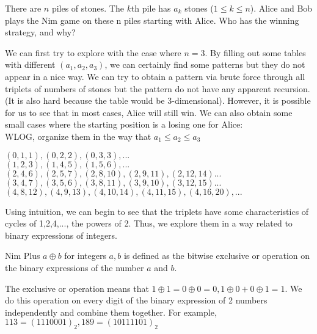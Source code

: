 		\begin{problem}
			There are $n$ piles of stones. The $k$th pile has $a_k$ stones ($1\leq k\leq n$). Alice and Bob plays the Nim game on these n piles starting with Alice. Who has the winning strategy, and why?
		\end{problem}
		We can first try to explore with the case where $n=3$. By filling out some tables with different $(a_1,a_2,a_3)$, we can certainly find some patterns but they do not appear in a nice way. We can try to obtain a pattern via brute force through all triplets of numbers of stones but the pattern do not have any apparent recursion. (It is also hard because the table would be 3-dimensional). However, it is possible for us to see that in most cases, Alice will still win. We can also obtain some small cases where the starting position is a losing one for Alice:\\
		WLOG, organize them in the way that $a_1 \leq a_2 \leq a_3$
		\begin{center}
		$(0,1,1),(0,2,2),(0,3,3),...$\\
		$(1,2,3),(1,4,5),(1,5,6),...$\\
		$(2,4,6),(2,5,7),(2,8,10),(2,9,11),(2,12,14)...$\\
		$(3,4,7),(3,5,6),(3,8,11),(3,9,10),(3,12,15)...$\\
		$(4,8,12),(4,9,13),(4,10,14),(4,11,15),(4,16,20),...$\\
		\end{center} 
		Using intuition, we can begin to see that the triplets have some characteristics of cycles of 1,2,4,..., the powers of 2. Thus, we explore them in a way related to binary expressions of integers.\\
		\begin{definition}
			Nim Plus $a \oplus b$ for integers $a,b$ is defined as the bitwise exclusive or operation on the binary expressions of the number $a$ and $b$.
		\end{definition}
		The exclusive or operation means that $1 \oplus 1 = 0 \oplus 0 = 0, 1 \oplus 0 + 0 \oplus 1 = 1$. We do this operation on every digit of the binary expression of 2 numbers independently and combine them together. For example, $113=(1110001)_2, 189=(10111101)_2$
	
